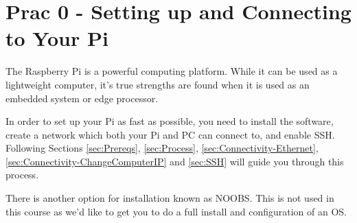 \setcounter{section}{-1}
\section{Prac 0 - Setting up and Connecting to Your Pi}
The Raspberry Pi is a powerful computing platform. While it can be used as a lightweight computer, it's true strengths are found when it is used as an embedded system or edge processor. 

In order to set up your Pi as fast as possible, you need to install the software, create a network which both your Pi and PC can connect to, and enable SSH. Following Sections \ref{sec:Prereqs}, \ref{sec:Process}, \ref{sec:Connectivity-Ethernet}, \ref{sec:Connectivity-ChangeComputerIP} and \ref{sec:SSH} will guide you through this process.

There is another option for installation known as NOOBS. This is not used in this course as we'd like to get you to do a full install and configuration of an OS.

